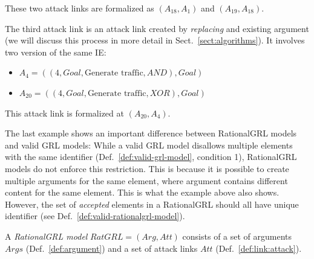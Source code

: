 These two attack links are formalized as $(A_{18},A_{1})$ and $(A_{19}, A_{18})$.

The third attack link is an attack link created by \emph{replacing} and existing argument (we will discuss this process in more detail in Sect.~\ref{sect:algorithms}). It involves two version of the same IE:
\begin{itemize}
\item $A_{4} = ((4, Goal, \text{Generate traffic}, AND), Goal)$
\item $A_{20} = ((4, Goal, \text{Generate traffic}, XOR), Goal)$
\end{itemize}

This attack link is formalized at $(A_{20},A_4)$.

The last example shows an important difference between RationalGRL models and valid GRL models: While a valid GRL model disallows multiple elements with the same identifier (Def.~\ref{def:valid-grl-model}, condition 1), RationalGRL models do not enforce this restriction. This is because it is possible to create multiple arguments for the same element, where argument contains different content for the same element. This is what the example above also shows. However, the set of \emph{accepted} elements in a RationalGRL should all have unique identifier (see Def.~\ref{def:valid-rationalgrl-model}).

\begin{definition}
\label{def:rationalgrl-model}
A \emph{RationalGRL model} $RatGRL=(Arg, Att)$ consists of a set of arguments $Args$ (Def.~\ref{def:argument}) and a set of attack links $Att$ (Def.~\ref{def:link:attack}).
\end{definition}

